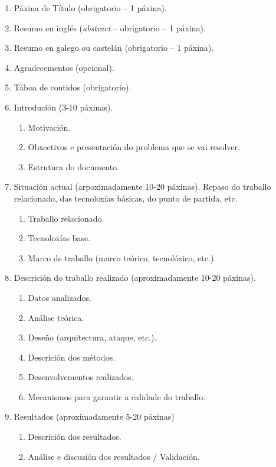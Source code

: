 \begin{enumerate}[noitemsep]
    \item Páxina de Título (obrigatorio -- 1 páxina).
    \item Resumo en inglés (\textit{abstract} -- obrigatorio -- 1 páxina).
    \item Resumo en galego ou castelán (obrigatorio -- 1 páxina).
    \item Agradecementos (opcional).
    \item Táboa de contidos (obrigatorio).
    \item Introdución (3-10 páxinas).
    \begin{enumerate}[noitemsep]
        \item Motivación.
        \item Obxectivos e presentación do problema que se vai resolver.
        \item Estrutura do documento.
    \end{enumerate}
    \item Situación actual (arpoximadamente 10-20 páxinas). Repaso do traballo relacionado, das tecnoloxías básicas, do punto de partida, etc. 
    \begin{enumerate}[noitemsep]
        \item Traballo relacionado.
        \item Tecnoloxías base.
        \item Marco de traballo (marco teórico, tecnolóxico, etc.).
    \end{enumerate}
    \item Descrición do traballo realizado (aproximadamente 10-20 páxinas). 
    \begin{enumerate}[noitemsep]
        \item Datos analizados.
        \item Análise teórica.
        \item Deseño (arquitectura, ataque, etc.).
        \item Descrición dos métodos. 
        \item Desenvolvementos realizados.
        \item Mecanismos para garantir a calidade do traballo.
    \end{enumerate}
    \item Resultados (aproximadamente 5-20 páxinas)
    \begin{enumerate}[noitemsep]
        \item Descrición dos resultados.
        \item Análise e discusión dos resultados / Validación.

\end{enumerate}
\end{enumerate}
